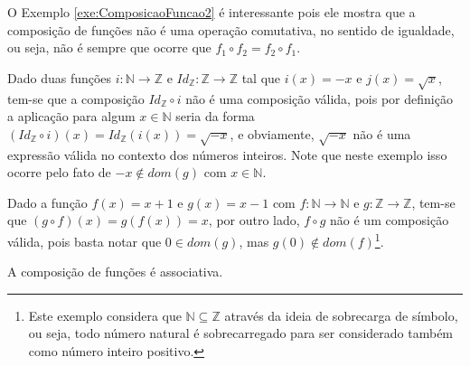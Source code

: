 O Exemplo \ref{exe:ComposicaoFuncao2} é interessante pois ele mostra que a composição de funções não é uma operação comutativa, no sentido de igualdade, ou seja, não é sempre que ocorre que $f_1 \circ f_2 = f_2 \circ f_1$. 

\begin{exemplo}\label{exe:ComposicaoFuncao3}
	Dado duas funções $i: \mathbb{N} \rightarrow \mathbb{Z}$ e $Id_\mathbb{Z} : \mathbb{Z} \rightarrow \mathbb{Z}$ tal que $i(x) = -x$ e $j(x) = \sqrt{x}$, tem-se que a composição $Id_\mathbb{Z} \circ i$ não é uma composição válida, pois por definição a aplicação para algum $x \in \mathbb{N}$ seria da forma $(Id_\mathbb{Z} \circ i)(x) = Id_\mathbb{Z}(i(x)) = \sqrt{-x}$, e obviamente, $\sqrt{-x}$ não é uma expressão válida no contexto dos números inteiros. Note que neste exemplo isso ocorre pelo fato de $-x \notin dom(g)$ com $x \in \mathbb{N}$.
\end{exemplo}

\begin{exemplo}\label{exe:ComposicaoFuncao4}
  Dado a função $f(x) = x + 1$ e $g(x) = x - 1$ com $f: \mathbb{N} \rightarrow \mathbb{N}$ e $g: \mathbb{Z} \rightarrow \mathbb{Z}$, tem-se que $(g \circ f)(x) = g(f(x)) = x$, por outro lado, $f \circ g$ não é um composição válida, pois basta notar que $0 \in dom(g)$, mas $g(0) \notin dom(f)$\footnote{Este exemplo considera que $\mathbb{N} \subseteq \mathbb{Z}$ através da ideia de sobrecarga de símbolo, ou seja, todo número natural é sobrecarregado para ser considerado também como número inteiro positivo.}. 
\end{exemplo}

\begin{proposicao}\label{prop:AssociativaComposicaoFuncao}
  A composição de funções é associativa.
\end{proposicao}

